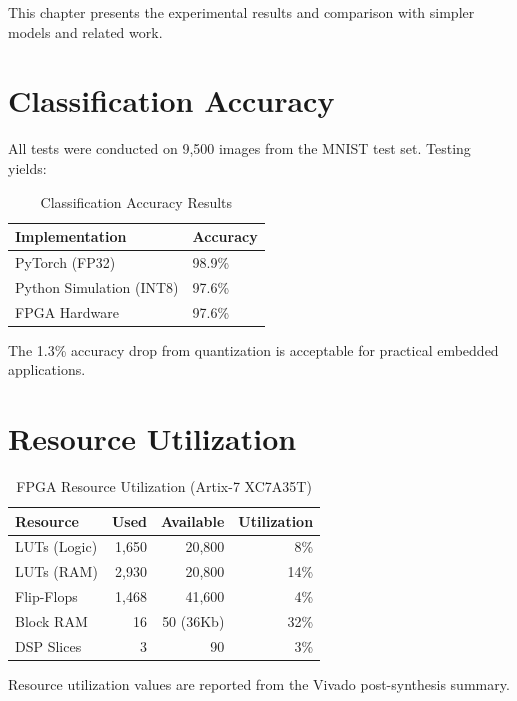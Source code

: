 \documentclass[12pt,a4paper]{report}
\begin{document}
This chapter presents the experimental results and comparison with simpler models and related work.

\section{Classification Accuracy}

All tests were conducted on 9,500 images from the MNIST test set. Testing yields:

\begin{table}[H]
\centering
\caption{Classification Accuracy Results}
\begin{tabular}{ll}
\toprule
\textbf{Implementation} & \textbf{Accuracy} \\
\midrule
PyTorch (FP32) & 98.9\% \\
Python Simulation (INT8) & 97.6\% \\
FPGA Hardware & 97.6\% \\
\bottomrule
\end{tabular}
\end{table}

The 1.3\% accuracy drop from quantization is acceptable for practical embedded applications.

\section{Resource Utilization}

\begin{table}[H]
\centering
\caption{FPGA Resource Utilization (Artix-7 XC7A35T)}
\begin{tabular}{lrrr}
\toprule
\textbf{Resource} & \textbf{Used} & \textbf{Available} & \textbf{Utilization} \\
\midrule
LUTs (Logic) & 1,650 & 20,800 & 8\% \\
LUTs (RAM) & 2,930 & 20,800 & 14\% \\
Flip-Flops & 1,468 & 41,600 & 4\% \\
Block RAM & 16 & 50 (36Kb) & 32\% \\
DSP Slices & 3 & 90 & 3\% \\
\bottomrule
\end{tabular}
\end{table}

Resource utilization values are reported from the Vivado post-synthesis summary.

\vspace{1em}
\end{document}
